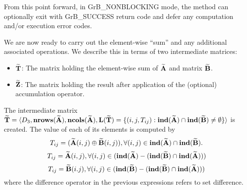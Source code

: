 From this point forward, in {\sf GrB\_NONBLOCKING} mode, the method can 
optionally exit with {\sf GrB\_SUCCESS} return code and defer any computation 
and/or execution error codes.

We are now ready to carry out the element-wise ``sum'' and any additional 
associated operations.  We describe this in terms of two intermediate matrices:
\begin{itemize}
	\item ${\bf \widetilde{T}}$: The matrix holding the element-wise sum of
    ${\bf \widetilde{A}}$ and matrix ${\bf \widetilde{B}}$.
	\item ${\bf \widetilde{Z}}$: The matrix holding the result after 
    application of the (optional) accumulation operator.
\end{itemize}

The intermediate matrix ${\bf \widetilde{T}} = \langle
D_3, \bold{nrows}({\bf \widetilde{A}}), \bold{ncols}({\bf \widetilde{A}}),
\bold{L}({\bf \widetilde{T}}) =
\{(i,j,T_{ij}) : \bold{ind}({\bf \widetilde{A}}) \cap 
\bold{ind}({\bf \widetilde{B}})
 \neq \emptyset \} \rangle$
is created.  The value of each of its elements is computed by 
\[T_{ij} = ({\bf \widetilde{A}}(i,j) \oplus {\bf \widetilde{B}}(i,j)), \forall (i,j) \in \bold{ind}({\bf \widetilde{A}}) \cap \bold{ind}({\bf \widetilde{B}}).\]
\[T_{ij} = {\bf \widetilde{A}}(i,j), \forall (i,j) \in (\bold{ind}({\bf \widetilde{A}}) - (\bold{ind}({\bf \widetilde{B}}) \cap \bold{ind}({\bf \widetilde{A}})))\]
\[T_{ij} = {\bf \widetilde{B}}(i.j), \forall (i,j) \in (\bold{ind}({\bf \widetilde{B}}) - (\bold{ind}({\bf \widetilde{B}}) \cap \bold{ind}({\bf \widetilde{A}})))\]
where the difference operator in the previous expressions refers to set difference.


